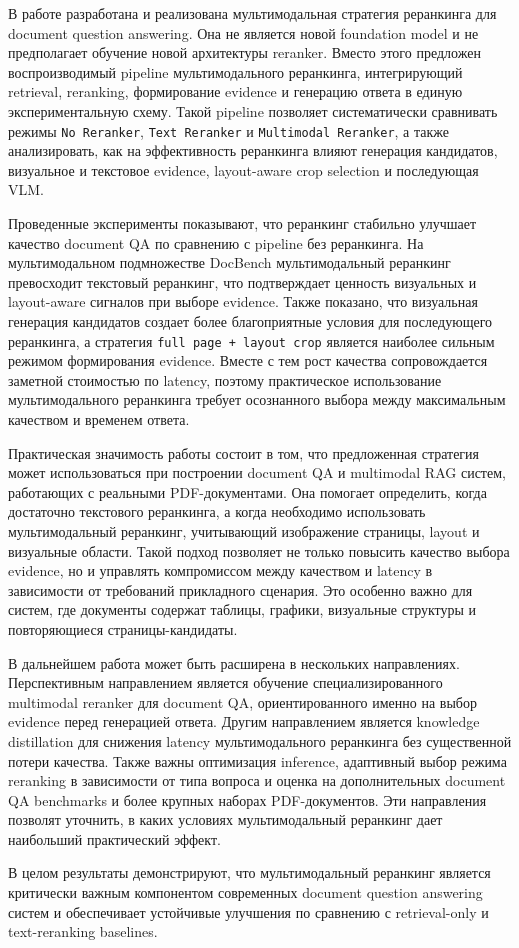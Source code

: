 \documentclass[conference]{IEEEtran}
\begin{document}
В работе разработана и реализована мультимодальная стратегия реранкинга для document question answering. Она не является новой foundation model и не предполагает обучение новой архитектуры reranker. Вместо этого предложен воспроизводимый pipeline мультимодального реранкинга, интегрирующий retrieval, reranking, формирование evidence и генерацию ответа в единую экспериментальную схему. Такой pipeline позволяет систематически сравнивать режимы \texttt{No Reranker}, \texttt{Text Reranker} и \texttt{Multimodal Reranker}, а также анализировать, как на эффективность реранкинга влияют генерация кандидатов, визуальное и текстовое evidence, layout-aware crop selection и последующая VLM.

Проведенные эксперименты показывают, что реранкинг стабильно улучшает качество document QA по сравнению с pipeline без реранкинга. На мультимодальном подмножестве DocBench мультимодальный реранкинг превосходит текстовый реранкинг, что подтверждает ценность визуальных и layout-aware сигналов при выборе evidence. Также показано, что визуальная генерация кандидатов создает более благоприятные условия для последующего реранкинга, а стратегия \texttt{full page + layout crop} является наиболее сильным режимом формирования evidence. Вместе с тем рост качества сопровождается заметной стоимостью по latency, поэтому практическое использование мультимодального реранкинга требует осознанного выбора между максимальным качеством и временем ответа.

Практическая значимость работы состоит в том, что предложенная стратегия может использоваться при построении document QA и multimodal RAG систем, работающих с реальными PDF-документами. Она помогает определить, когда достаточно текстового реранкинга, а когда необходимо использовать мультимодальный реранкинг, учитывающий изображение страницы, layout и визуальные области. Такой подход позволяет не только повысить качество выбора evidence, но и управлять компромиссом между качеством и latency в зависимости от требований прикладного сценария. Это особенно важно для систем, где документы содержат таблицы, графики, визуальные структуры и повторяющиеся страницы-кандидаты.

В дальнейшем работа может быть расширена в нескольких направлениях. Перспективным направлением является обучение специализированного multimodal reranker для document QA, ориентированного именно на выбор evidence перед генерацией ответа. Другим направлением является knowledge distillation для снижения latency мультимодального реранкинга без существенной потери качества. Также важны оптимизация inference, адаптивный выбор режима reranking в зависимости от типа вопроса и оценка на дополнительных document QA benchmarks и более крупных наборах PDF-документов. Эти направления позволят уточнить, в каких условиях мультимодальный реранкинг дает наибольший практический эффект.

В целом результаты демонстрируют, что мультимодальный реранкинг является критически важным компонентом современных document question answering систем и обеспечивает устойчивые улучшения по сравнению с retrieval-only и text-reranking baselines.





\end{document}
